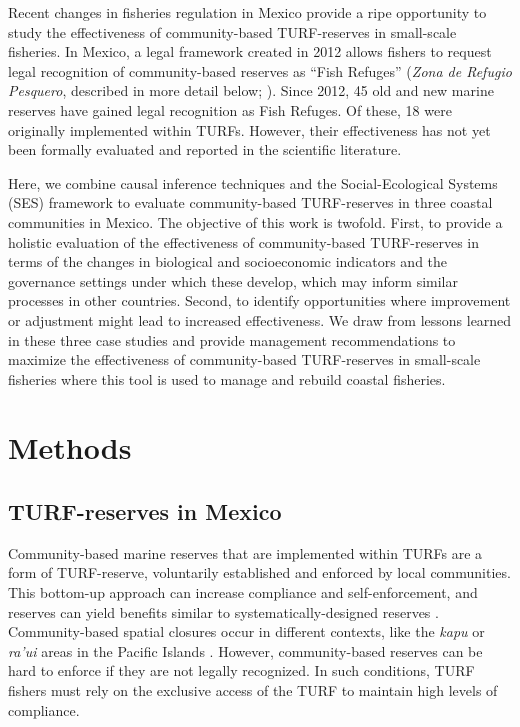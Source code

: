 \documentclass{frontiersSCNS}
\begin{document}
Recent changes in fisheries regulation in Mexico provide a ripe opportunity to study the effectiveness of community-based TURF-reserves in small-scale fisheries. In Mexico, a legal framework created in 2012 allows fishers to request legal recognition of community-based reserves as ``Fish Refuges'' (\emph{Zona de Refugio Pesquero}, described in more detail below; \citet{nom}). Since 2012, 45 old and new marine reserves have gained legal recognition as Fish Refuges. Of these, 18 were originally implemented within TURFs. However, their effectiveness has not yet been formally evaluated and reported in the scientific literature.

Here, we combine causal inference techniques and the Social-Ecological Systems (SES) framework to evaluate community-based TURF-reserves in three coastal communities in Mexico. The objective of this work is twofold. First, to provide a holistic evaluation of the effectiveness of community-based TURF-reserves in terms of the changes in biological and socioeconomic indicators and the governance settings under which these develop, which may inform similar processes in other countries. Second, to identify opportunities where improvement or adjustment might lead to increased effectiveness. We draw from lessons learned in these three case studies and provide management recommendations to maximize the effectiveness of community-based TURF-reserves in small-scale fisheries where this tool is used to manage and rebuild coastal fisheries.

\hypertarget{methods}{%
\section{Methods}\label{methods}}

\hypertarget{turf-reserves-in-mexico}{%
\subsection{TURF-reserves in Mexico}\label{turf-reserves-in-mexico}}

Community-based marine reserves that are implemented within TURFs are a form of TURF-reserve, voluntarily established and enforced by local communities. This bottom-up approach can increase compliance and self-enforcement, and reserves can yield benefits similar to systematically-designed reserves \citep{beger_2004,smallhornwest_2018}. Community-based spatial closures occur in different contexts, like the \emph{kapu} or \emph{ra'ui} areas in the Pacific Islands \citep{johannes_2002,bohnsack_2004}. However, community-based reserves can be hard to enforce if they are not legally recognized. In such conditions, TURF fishers must rely on the exclusive access of the TURF to maintain high levels of compliance.
\end{document}
